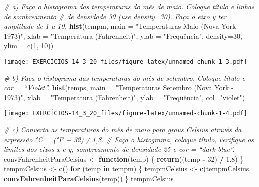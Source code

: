 \documentclass[]{article}
\newenvironment{Shaded}{\begin{snugshade}}{\end{snugshade}}
\newcommand{\CommentTok}[1]{\textcolor[rgb]{0.56,0.35,0.01}{\textit{#1}}}
\newcommand{\ControlFlowTok}[1]{\textcolor[rgb]{0.13,0.29,0.53}{\textbf{#1}}}
\newcommand{\DataTypeTok}[1]{\textcolor[rgb]{0.13,0.29,0.53}{#1}}
\newcommand{\DecValTok}[1]{\textcolor[rgb]{0.00,0.00,0.81}{#1}}
\newcommand{\FloatTok}[1]{\textcolor[rgb]{0.00,0.00,0.81}{#1}}
\newcommand{\KeywordTok}[1]{\textcolor[rgb]{0.13,0.29,0.53}{\textbf{#1}}}
\newcommand{\NormalTok}[1]{#1}
\newcommand{\OperatorTok}[1]{\textcolor[rgb]{0.81,0.36,0.00}{\textbf{#1}}}
\newcommand{\StringTok}[1]{\textcolor[rgb]{0.31,0.60,0.02}{#1}}
\begin{document}
\begin{Shaded}
\begin{Highlighting}[]
\CommentTok{# a) Faça o histograma das temperaturas do mês de maio. Coloque título e linhas de sombreamento}
\CommentTok{# de densidade 30 (use density=30). Faça o eixo y ter amplitude de 1 a 10.}
\KeywordTok{hist}\NormalTok{(tempm,}
     \DataTypeTok{main =} \StringTok{"Temperaturas Maio (Nova York - 1973)"}\NormalTok{,}
     \DataTypeTok{xlab =} \StringTok{"Temperatura (Fahrenheit)"}\NormalTok{,}
     \DataTypeTok{ylab =} \StringTok{"Frequência",}
\StringTok{     density=30,}
\StringTok{     ylim = c(1, 10))}
\end{Highlighting}
\end{Shaded}

\texttt{[image: EXERCÍCIOS-14\_3\_20\_files/figure-latex/unnamed-chunk-1-3.pdf]}

\begin{Shaded}
\begin{Highlighting}[]
\CommentTok{# b) Faça o histograma das temperaturas do mês de setembro. Coloque título e cor = “Violet”.}
\KeywordTok{hist}\NormalTok{(temps,}
     \DataTypeTok{main =} \StringTok{"Temperaturas Setembro (Nova York - 1973)"}\NormalTok{,}
     \DataTypeTok{xlab =} \StringTok{"Temperatura (Fahrenheit)"}\NormalTok{,}
     \DataTypeTok{ylab =} \StringTok{"Frequência",}
\StringTok{     col="}\NormalTok{violet}\StringTok{")}
\end{Highlighting}
\end{Shaded}

\texttt{[image: EXERCÍCIOS-14\_3\_20\_files/figure-latex/unnamed-chunk-1-4.pdf]}

\begin{Shaded}
\begin{Highlighting}[]
\CommentTok{# c) Converta as temperaturas do mês de maio para graus Celsius através da expressão °C = (°F − 32) / 1,8.}
\CommentTok{# Faça o histograma, coloque título, verifique os limites dos eixos x e y, sombreamento de densidade 25 e cor = “dark blue”.}
\NormalTok{convFahrenheitParaCelsius <-}\StringTok{ }\ControlFlowTok{function}\NormalTok{(temp)}
\NormalTok{\{}
  \KeywordTok{return}\NormalTok{((temp }\OperatorTok{-}\StringTok{ }\DecValTok{32}\NormalTok{) }\OperatorTok{/}\StringTok{ }\FloatTok{1.8}\NormalTok{)}
\NormalTok{\}}
\NormalTok{tempmCelsius <-}\StringTok{ }\KeywordTok{c}\NormalTok{()}
\ControlFlowTok{for}\NormalTok{ (temp }\ControlFlowTok{in}\NormalTok{ tempm) \{}
\NormalTok{  tempmCelsius <-}\StringTok{ }\KeywordTok{c}\NormalTok{(tempmCelsius, }\KeywordTok{convFahrenheitParaCelsius}\NormalTok{(temp))}
\NormalTok{\}}
\NormalTok{tempmCelsius}
\end{Highlighting}
\end{Shaded}
\end{document}
